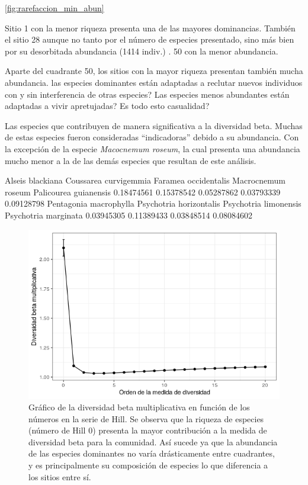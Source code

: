 \documentclass[11pt,]{article}
\begin{document}
 \ref{fig:rarefaccion_min_abun}

Sitio 1 con la menor riqueza presenta una de las mayores dominancias.
También el sitio 28 aunque no tanto por el número de especies
presentado, sino más bien por su desorbitada abundancia (1414 indiv.) .
50 con la menor abundancia.

Aparte del cuadrante 50, los sitios con la mayor riqueza presentan
también mucha abundancia. las especies dominantes están adaptadas a
reclutar nuevos individuos con y sin interferencia de otras especies?
Las especies menos abundantes están adaptadas a vivir apretujadas? Es
todo esto casualidad?

Las especies que contribuyen de manera significativa a la diversidad
beta. Muchas de estas especies fueron consideradas ``indicadoras''
debido a su abundancia. Con la excepción de la especie \emph{Macocnemum
roseum}, la cual presenta una abundancia mucho menor a la de las demás
especies que resultan de este análisis.

Alseis blackiana Coussarea curvigemmia Faramea occidentalis Macrocnemum
roseum Palicourea guianensis 0.18474561 0.15378542 0.05287862 0.03793339
0.09128798 Pentagonia macrophylla Psychotria horizontalis Psychotria
limonensis Psychotria marginata 0.03945305 0.11389433 0.03848514
0.08084602

\begin{figure}
\centering
\includegraphics{grafico_divrsdad_beta_hill.png}
\caption{Gráfico de la diversidad beta multiplicativa en función de los
números en la serie de Hill. Se observa que la riqueza de especies
(número de Hill 0) presenta la mayor contribución a la medida de
diversidad beta para la comunidad. Así sucede ya que la abundancia de
las especies dominantes no varía drásticamente entre cuadrantes, y es
principalmente su composición de especies lo que diferencia a los sitios
entre sí. \label{fig:grafico_divrsdad_beta_hill}}
\end{figure}
\end{document}
